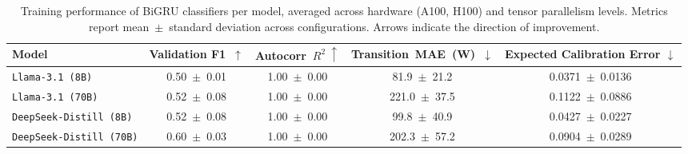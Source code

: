 \begin{table*}[!htb]
\centering
\small
\caption{Training performance of BiGRU classifiers per model, averaged across hardware (A100, H100) and tensor parallelism levels. 
Metrics report mean~$\pm$~standard deviation across configurations. 
Arrows indicate the direction of improvement.}
\label{tab:train_eval_model}
\vspace{0.4em}
\begin{tabular}{lcccc}
\toprule
\textbf{Model} & \textbf{Validation F1~$\uparrow$} & \textbf{Autocorr~$R^2~\uparrow$} & \textbf{Transition~MAE~(W)~$\downarrow$} & \textbf{Expected Calibration Error} $\downarrow$ \\
\midrule
\texttt{Llama-3.1 (8B)} & 0.50~$\pm$~0.01 & 1.00~$\pm$~0.00 & 81.9~$\pm$~21.2 & 0.0371~$\pm$~0.0136 \\
\texttt{Llama-3.1 (70B)} & 0.52~$\pm$~0.08 & 1.00~$\pm$~0.00 & 221.0~$\pm$~37.5 & 0.1122~$\pm$~0.0886 \\
\texttt{DeepSeek-Distill (8B)} & 0.52~$\pm$~0.08 & 1.00~$\pm$~0.00 & 99.8~$\pm$~40.9 & 0.0427~$\pm$~0.0227 \\
\texttt{DeepSeek-Distill (70B)} & 0.60~$\pm$~0.03 & 1.00~$\pm$~0.00 & 202.3~$\pm$~57.2 & 0.0904~$\pm$~0.0289 \\
\bottomrule
\end{tabular}
\end{table*}